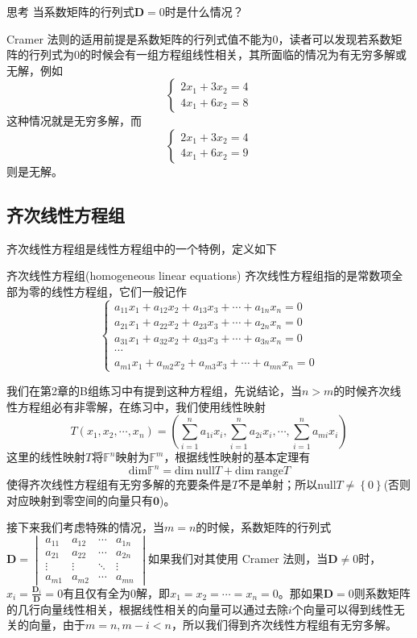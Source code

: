 \begin{ascolorbox1}{思考}
	当系数矩阵的行列式$\mathbf{D}=0$时是什么情况？
\end{ascolorbox1}

Cramer 法则的适用前提是系数矩阵的行列式值不能为0，读者可以发现若系数矩阵的行列式为0的时候会有一组方程组线性相关，其所面临的情况为有无穷多解或无解，例如$$\left\{\begin{matrix} 
	2x_1+3x_2 = 4 \\  
	4x_1+6x_2 = 8
  \end{matrix}\right. $$这种情况就是无穷多解，而$$\left\{\begin{matrix} 
	2x_1+3x_2 = 4 \\  
	4x_1+6x_2 = 9
  \end{matrix}\right. $$则是无解。

\subsection{齐次线性方程组}

\label{subsec:homogeneous}

齐次线性方程组是线性方程组中的一个特例，定义如下
\begin{definition}{齐次线性方程组(homogeneous linear equations)}
	齐次线性方程组指的是常数项全部为零的线性方程组，它们一般记作$$\left\{\begin{matrix} 
		a_{11}x_1+a_{12}x_2+a_{13}x_3+\cdots+a_{1n}x_n=0 \\  
		a_{21}x_1+a_{22}x_2+a_{23}x_3+\cdots+a_{2n}x_n=0 \\  
		a_{31}x_1+a_{32}x_2+a_{33}x_3+\cdots+a_{3n}x_n=0 \\
		\cdots \\
		a_{m1}x_1+a_{m2}x_2+a_{m3}x_3+\cdots+a_{mn}x_n=0
	  \end{matrix}\right. $$
\end{definition}

我们在第2章的B组练习中有提到这种方程组，先说结论，当$n>m$的时候齐次线性方程组必有非零解，在练习中，我们使用线性映射$$T(x_1,x_2,\cdots,x_n)=\left( \sum_{i=1}^{n}a_{1i}x_i,\sum_{i=1}^{n}a_{2i}x_i,\cdots,\sum_{i=1}^{n}a_{mi}x_i \right)$$这里的线性映射$T$将$\mathbb{F}^n$映射为$\mathbb{F}^m$，根据线性映射的基本定理有$$\text{dim}\mathbb{F}^n=\text{dim}~\text{null}T+\text{dim}~\text{range}T$$使得齐次线性方程组有无穷多解的充要条件是$T$不是单射；所以$\text{null}T\neq \left\{ 0 \right\}$(否则对应映射到零空间的向量只有$\boldsymbol{0}$)。

接下来我们考虑特殊的情况，当$m=n$的时候，系数矩阵的行列式$\mathbf{D}=\begin{vmatrix}  
	a_{11}& a_{12}& \cdots  & a_{1n} \\  
	a_{21}& a_{22}& \cdots  & a_{2n} \\  
	\vdots & \vdots & \ddots & \vdots \\  
	a_{m1}& a_{m2}& \cdots  & a_{mn}  
  \end{vmatrix}  
$如果我们对其使用 Cramer 法则，当$\mathbf{D}\neq 0$时，$\displaystyle x_i=\frac{\mathbf{D}_i}{\mathbf{D}}=0$有且仅有全为0解，即$x_1=x_2=\cdots=x_n=0$。那如果$\mathbf{D}= 0$则系数矩阵的几行向量线性相关，根据线性相关的向量可以通过去除$i$个向量可以得到线性无关的向量，由于$m=n,m-i<n$，所以我们得到齐次线性方程组有无穷多解。

